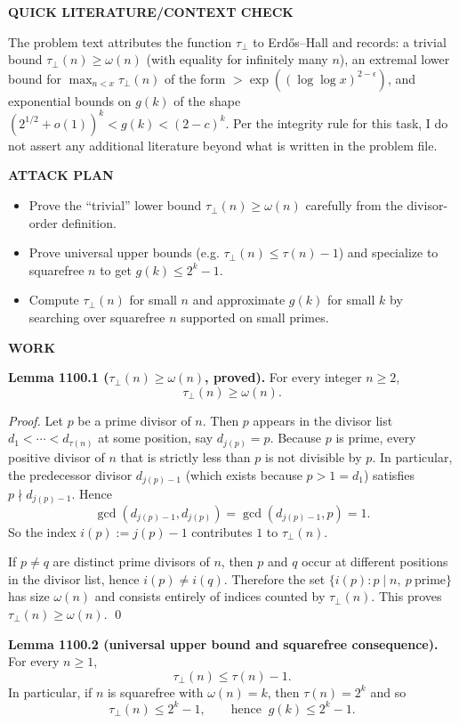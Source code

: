 \medskip
\noindent\textbf{QUICK LITERATURE/CONTEXT CHECK}

\smallskip
\noindent
The problem text attributes the function $\tau_\perp$ to Erd\H{o}s--Hall and records: a trivial bound $\tau_\perp(n)\ge \omega(n)$ (with equality for infinitely many $n$), an extremal lower bound for $\max_{n<x}\tau_\perp(n)$ of the form $>\exp((\log\log x)^{2-\epsilon})$, and exponential bounds on $g(k)$ of the shape $(2^{1/2}+o(1))^k<g(k)<(2-c)^k$. Per the integrity rule for this task, I do not assert any additional literature beyond what is written in the problem file.

\medskip
\noindent\textbf{ATTACK PLAN}

\smallskip
\noindent
\begin{itemize}
\item Prove the ``trivial'' lower bound $\tau_\perp(n)\ge \omega(n)$ carefully from the divisor-order definition.
\item Prove universal upper bounds (e.g. $\tau_\perp(n)\le \tau(n)-1$) and specialize to squarefree $n$ to get $g(k)\le 2^k-1$.
\item Compute $\tau_\perp(n)$ for small $n$ and approximate $g(k)$ for small $k$ by searching over squarefree $n$ supported on small primes.
\end{itemize}

\medskip
\noindent\textbf{WORK}

\smallskip
\noindent\textbf{Lemma 1100.1 ($\tau_\perp(n)\ge \omega(n)$, proved).}
For every integer $n\ge 2$,
\[
\tau_\perp(n)\ge \omega(n).
\]

\smallskip
\noindent\emph{Proof.}
Let $p$ be a prime divisor of $n$. Then $p$ appears in the divisor list $d_1<\cdots<d_{\tau(n)}$ at some position, say $d_{j(p)}=p$.
Because $p$ is prime, every positive divisor of $n$ that is strictly less than $p$ is not divisible by $p$. In particular, the predecessor divisor $d_{j(p)-1}$ (which exists because $p>1=d_1$) satisfies $p\nmid d_{j(p)-1}$. Hence
\[
\gcd(d_{j(p)-1},d_{j(p)})=\gcd(d_{j(p)-1},p)=1.
\]
So the index $i(p):=j(p)-1$ contributes $1$ to $\tau_\perp(n)$.

If $p\ne q$ are distinct prime divisors of $n$, then $p$ and $q$ occur at different positions in the divisor list, hence $i(p)\ne i(q)$. Therefore the set $\{i(p): p\mid n,\ p\ \text{prime}\}$ has size $\omega(n)$ and consists entirely of indices counted by $\tau_\perp(n)$. This proves $\tau_\perp(n)\ge \omega(n)$. \qed

\smallskip
\noindent\textbf{Lemma 1100.2 (universal upper bound and squarefree consequence).}
For every $n\ge 1$,
\[
\tau_\perp(n)\le \tau(n)-1.
\]
In particular, if $n$ is squarefree with $\omega(n)=k$, then $\tau(n)=2^k$ and so
\[
\tau_\perp(n)\le 2^k-1,\qquad\text{hence }\ g(k)\le 2^k-1.
\]

